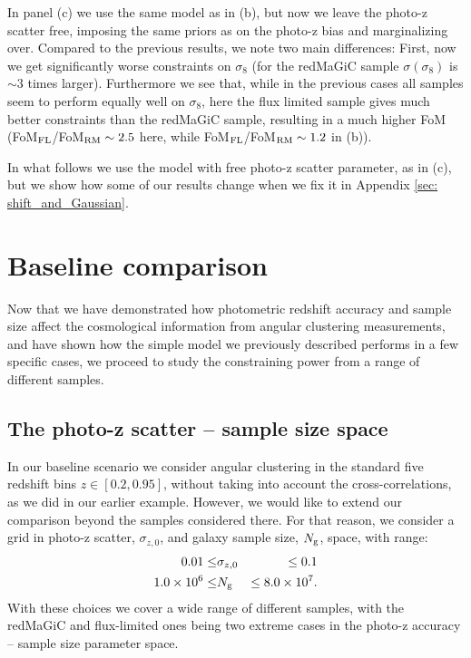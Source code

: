 \documentclass[a4paper,fleqn,usenatbib]{mnras}
\begin{document}
In panel (c) we use the same model as in (b), but now we leave the photo-z scatter free, imposing the same priors as on the photo-z bias and marginalizing over. Compared to the previous results, we note two main differences: First, now we get significantly worse constraints on $\sigma_8$ (for the redMaGiC sample $\sigma(\sigma_8)$ is $\sim 3$ times larger). Furthermore we see that, while in the previous cases all samples seem to perform equally well on $\sigma_8$, here the flux limited sample gives much better constraints than the redMaGiC sample, resulting in a much higher FoM (FoM$_{\mbox{\scriptsize{FL}}}$/FoM$_{\mbox{\scriptsize{RM}}} \sim 2.5$ here, while FoM$_{\mbox{\scriptsize{FL}}}$/FoM$_{\mbox{\scriptsize{RM}}} \sim 1.2$ in (b)). 

In what follows we use the model with free photo-z scatter parameter, as in (c), but we show how some of our results change when we fix it in Appendix \ref{sec: shift_and_Gaussian}.

\section{Baseline comparison}
\label{sec: Baseline}

Now that we have demonstrated how photometric redshift accuracy and sample size affect the cosmological information from angular clustering measurements, and have shown how the simple model we previously described performs in a few specific cases, we proceed to study the constraining power from a range of different samples.


\subsection{The photo-z scatter -- sample size space}
\label{subsec: sig_sample_space}

In our baseline scenario we consider angular clustering in the standard five redshift bins $z \in [0.2, 0.95]$, without taking into account the cross-correlations, as we did in our earlier example. However, we would like to extend our comparison beyond the samples considered there. For that reason, we consider a grid in photo-z scatter, $\sigma_{z,0}$, and galaxy sample size, $N_{\mbox{\scriptsize{g}}}$, space, with range:
\begin{eqnarray}
0.01\leq &\sigma_{z,0} &\leq 0.1 \\
1.0 \times 10^6 \leq &N_{\mbox{\scriptsize{g}}} &\leq 8.0 \times 10^7.
\end{eqnarray}
With these choices we cover a wide range of different samples, with the redMaGiC and flux-limited ones being two extreme cases in the photo-z accuracy  -- sample size parameter space.  
\end{document}
